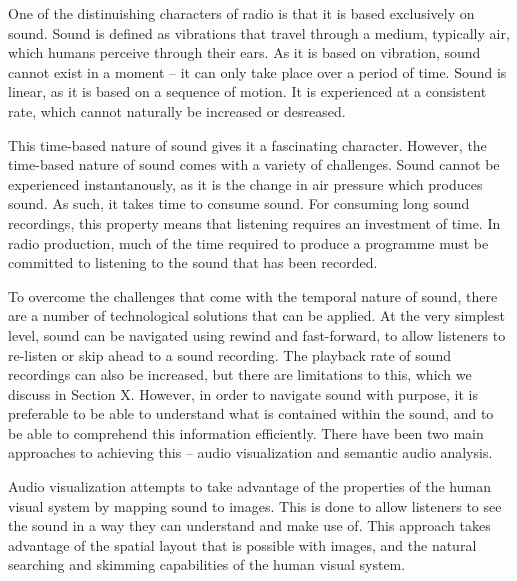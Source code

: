 
One of the distinuishing characters of radio is that it is based exclusively on sound.
Sound is defined as vibrations that travel through a medium, typically air, which humans perceive through their ears.
As it is based on vibration, sound cannot exist in a moment -- it can only take place over a period of time.
Sound is linear, as it is based on a sequence of motion.
It is experienced at a consistent rate, which cannot naturally be increased or desreased.

This time-based nature of sound gives it a fascinating character.
However, the time-based nature of sound comes with a variety of challenges.
Sound cannot be experienced instantanously, as it is the change in air pressure which produces sound.
As such, it takes time to consume sound.
For consuming long sound recordings, this property means that listening requires an investment of time.
In radio production, much of the time required to produce a programme must be committed to listening to the sound that has been recorded.

To overcome the challenges that come with the temporal nature of sound, there are a number of technological solutions
that can be applied. At the very simplest level, sound can be navigated using rewind and fast-forward, to allow
listeners to re-listen or skip ahead to a sound recording. The playback rate of sound recordings can also be increased,
but there are limitations to this, which we discuss in Section X. However, in order to navigate sound with purpose, it
is preferable to be able to understand what is contained within the sound, and to be able to comprehend this
information efficiently. There have been two main approaches to achieving this -- audio visualization and semantic
audio analysis.

Audio visualization attempts to take advantage of the properties of the human visual system by mapping sound to images.
This is done to allow listeners to see the sound in a way they can understand and make use of. This approach takes
advantage of the spatial layout that is possible with images, and the natural searching and skimming capabilities of
the human visual system.

